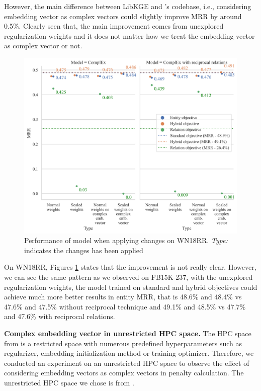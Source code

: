 However, the main difference between LibKGE and \citet{chen2021relation}'s codebase, i.e., considering embedding vector as complex vectors could slightly improve MRR by around 0.5\%. Clearly seen that, the main improvement comes from unexplored regularization weights and it does not matter how we treat the embedding vector as complex vector or not. 

\begin{figure}[!htbp]
	\begin{center}
	\includegraphics[width=\linewidth]{Images/Ablation_WNRR.png}
	\caption[Performance of model when applying changes on WN18RR]{Performance of model when applying changes on WN18RR. \textit{Type:} indicates the changes has been applied}
	\label{fig:Ablation WNRR}
	\end{center}
\end{figure}

On WN18RR, Figures \ref{fig:Ablation WNRR} states that the improvement is not really clear. However, we can see the same pattern as we observed on FB15K-237, with the unexplored regularization weights, the model trained on standard and hybrid objectives could achieve much more better results in entity MRR, that is 48.6\% and 48.4\% vs 47.6\% and 47.5\% without reciprocal technique and 49.1\% and 48.5\% vs 47.7\% and 47.6\% with reciprocal relations.
\newline

\noindent\textbf{Complex embedding vector in unrestricted HPC space.} The HPC space from \citet{chen2021relation} is a restricted space with numerous predefined hyperparameters such as regularizer, embedding initialization method or training optimizer. Therefore, we conducted an experiment on an unrestricted HPC space to observe the effect of considering embedding vectors as complex vectors in penalty calculation. The unrestricted HPC space we chose is from \citet{Ruffinelli2020You}. 

